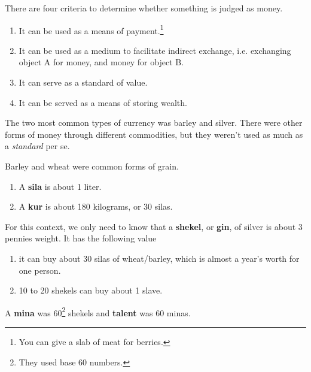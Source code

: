 \documentclass{article}
\begin{document}
    \begin{definition}[Money]
      There are four criteria to determine whether something is judged as money. 
      \begin{enumerate}
        \item It can be used as a means of payment.\footnote{You can give a slab of meat for berries. } 
        \item It can be used as a medium to facilitate indirect exchange, i.e. exchanging object A for money, and money for object B. 
        \item It can serve as a standard of value. 
        \item It can be served as a means of storing wealth. 
      \end{enumerate}
    \end{definition}

    The two most common types of currency was barley and silver. There were other forms of money through different commodities, but they weren't used as much as a \textit{standard} per se. 

    \begin{definition} 
      Barley and wheat were common forms of grain. 
      \begin{enumerate}
        \item A \textbf{sila} is about 1 liter. 
        \item A \textbf{kur} is about 180 kilograms, or 30 silas.
      \end{enumerate}
    \end{definition}

    \begin{definition}
      For this context, we only need to know that a \textbf{shekel}, or \textbf{gin}, of silver is about 3 pennies weight. It has the following value 
      \begin{enumerate}
        \item it can buy about 30 silas of wheat/barley, which is almost a year's worth for one person. 
        \item 10 to 20 shekels can buy about 1 slave. 
      \end{enumerate}
      A \textbf{mina} was 60\footnote{They used base 60 numbers.} shekels and \textbf{talent} was 60 minas. 
    \end{definition}
\end{document}
